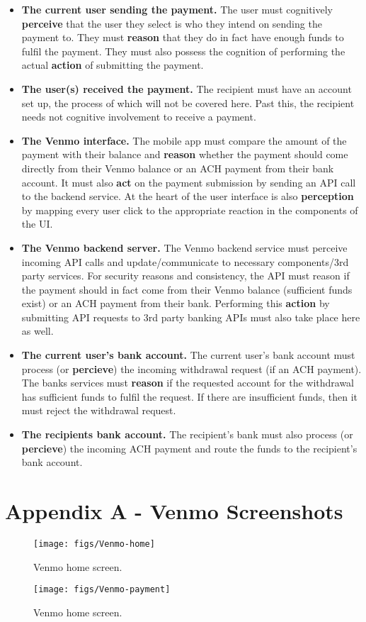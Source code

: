 \begin{itemize}
\item
  \textbf{The current user sending the payment.} The user must cognitively \textbf{perceive} that the user they select is who they intend on sending the payment to. They must \textbf{reason} that they do in fact have enough funds to fulfil the payment. They must also possess the cognition of performing the actual \textbf{action} of submitting the payment.
\item
  \textbf{The user(s) received the payment.} The recipient must have an account set up, the process of which will not be covered here. Past this, the recipient needs not cognitive involvement to receive a payment.
\item
  \textbf{The Venmo interface.} The mobile app must compare the amount of the payment with their balance and \textbf{reason} whether the payment should come directly from their Venmo balance or an ACH payment from their bank account. It must also \textbf{act} on the payment submission by sending an API call to the backend service. At the heart of the user interface is also \textbf{perception} by mapping every user click to the appropriate reaction in the components of the UI.
\item
  \textbf{The Venmo backend server.} The Venmo backend service must perceive incoming API calls and update/communicate to necessary components/3rd party services. For security reasons and consistency, the API must reason if the payment should in fact come from their Venmo balance (sufficient funds exist) or an ACH payment from their bank. Performing this \textbf{action} by submitting API requests to 3rd party banking APIs must also take place here as well.
\item
  \textbf{The current user's bank account.} The current user's bank account must process (or \textbf{percieve}) the incoming withdrawal request (if an ACH payment). The banks services must \textbf{reason} if the requested account for the withdrawal has sufficient funds to fulfil the request. If there are insufficient funds, then it must reject the withdrawal request.
\item
  \textbf{The recipients bank account.} The recipient's bank must also process (or \textbf{percieve}) the incoming ACH payment and route the funds to the recipient's bank account.
\end{itemize}

\clearpage

\section{Appendix A - Venmo Screenshots}

\begin{figure}[H]
  \centering
  \texttt{[image: figs/Venmo-home]}
  \caption{Venmo home screen.}
  \label{fig::1}
\end{figure}

\begin{figure}[H]
  \centering
  \texttt{[image: figs/Venmo-payment]}
  \caption{Venmo home screen.}
  \label{fig::1}
\end{figure}



